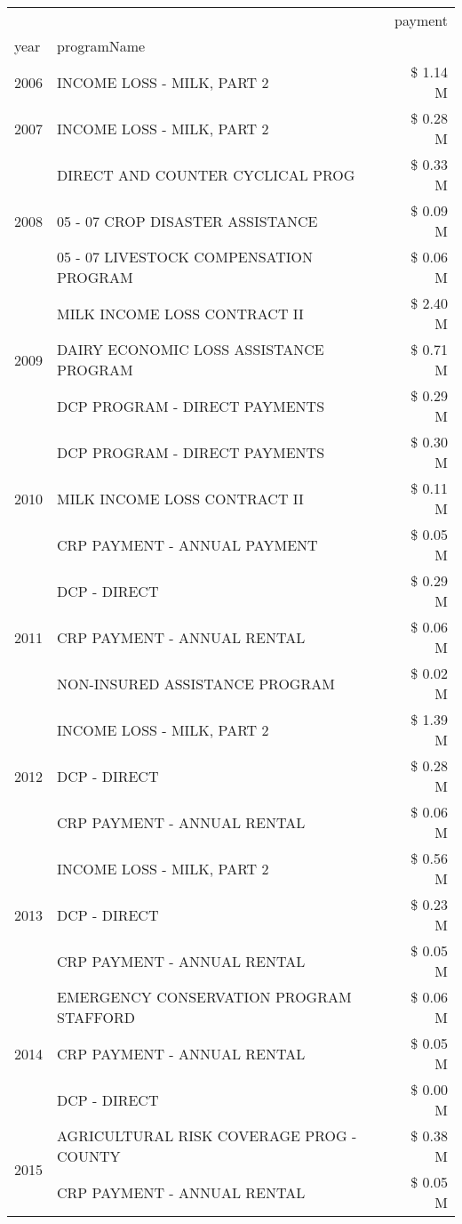 \begin{tabular}{llr}
\toprule
 &  & payment \\
year & programName &  \\
\midrule
2006 & INCOME LOSS - MILK, PART 2 & \$ 1.14 M \\
\cline{1-3}
2007 & INCOME LOSS - MILK, PART 2 & \$ 0.28 M \\
\cline{1-3}
\multirow[t]{3}{*}{2008} & DIRECT AND COUNTER CYCLICAL PROG & \$ 0.33 M \\
 & 05 - 07 CROP DISASTER ASSISTANCE & \$ 0.09 M \\
 & 05 - 07 LIVESTOCK COMPENSATION PROGRAM & \$ 0.06 M \\
\cline{1-3}
\multirow[t]{3}{*}{2009} & MILK INCOME LOSS CONTRACT II & \$ 2.40 M \\
 & DAIRY ECONOMIC LOSS ASSISTANCE PROGRAM & \$ 0.71 M \\
 & DCP PROGRAM - DIRECT PAYMENTS & \$ 0.29 M \\
\cline{1-3}
\multirow[t]{3}{*}{2010} & DCP PROGRAM - DIRECT PAYMENTS & \$ 0.30 M \\
 & MILK INCOME LOSS CONTRACT II & \$ 0.11 M \\
 & CRP PAYMENT - ANNUAL PAYMENT & \$ 0.05 M \\
\cline{1-3}
\multirow[t]{3}{*}{2011} & DCP - DIRECT & \$ 0.29 M \\
 & CRP PAYMENT - ANNUAL RENTAL & \$ 0.06 M \\
 & NON-INSURED ASSISTANCE PROGRAM & \$ 0.02 M \\
\cline{1-3}
\multirow[t]{3}{*}{2012} & INCOME LOSS - MILK, PART 2 & \$ 1.39 M \\
 & DCP - DIRECT & \$ 0.28 M \\
 & CRP PAYMENT - ANNUAL RENTAL & \$ 0.06 M \\
\cline{1-3}
\multirow[t]{3}{*}{2013} & INCOME LOSS - MILK, PART 2 & \$ 0.56 M \\
 & DCP - DIRECT & \$ 0.23 M \\
 & CRP PAYMENT - ANNUAL RENTAL & \$ 0.05 M \\
\cline{1-3}
\multirow[t]{3}{*}{2014} & EMERGENCY CONSERVATION PROGRAM STAFFORD & \$ 0.06 M \\
 & CRP PAYMENT - ANNUAL RENTAL & \$ 0.05 M \\
 & DCP - DIRECT & \$ 0.00 M \\
\cline{1-3}
\multirow[t]{3}{*}{2015} & AGRICULTURAL RISK COVERAGE PROG - COUNTY & \$ 0.38 M \\
 & CRP PAYMENT - ANNUAL RENTAL & \$ 0.05 M \\

\end{tabular}
